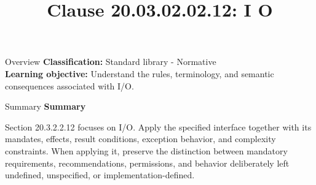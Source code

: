 \documentclass[10pt,letterpaper]{article}
\title{Clause 20.03.02.02.12: I O}
\author{}
\date{}
\begin{document}
\maketitle
\begin{CornellOverviewBox}{Overview}
\textbf{Classification:} Standard library - Normative\\[2pt]
\textbf{Learning objective:} Understand the rules, terminology, and semantic consequences associated with I/O.
\end{CornellOverviewBox}\begin{CornellSummaryBox}{Summary}
{\sffamily\bfseries\color{Accent} Summary}\par\vspace{3pt}Section 20.3.2.2.12 focuses on I/O. Apply the specified interface together with its mandates, effects, result conditions, exception behavior, and complexity constraints. When applying it, preserve the distinction between mandatory requirements, recommendations, permissions, and behavior deliberately left undefined, unspecified, or implementation-defined.
\end{CornellSummaryBox}
\end{document}
